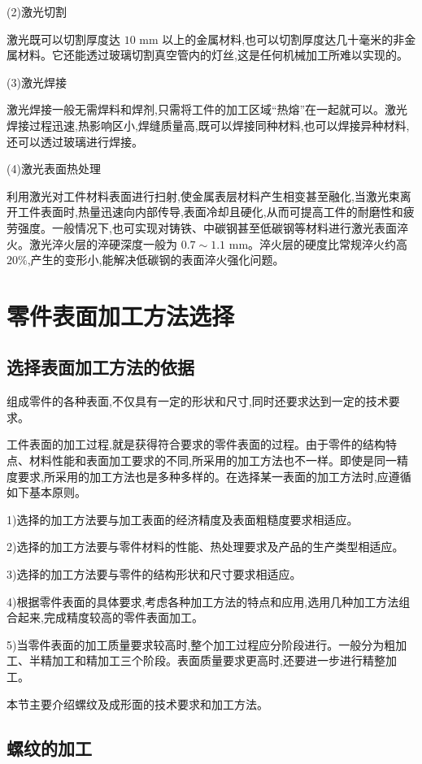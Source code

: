 \documentclass[UTF8]{ctexbook}
\newcommand{\◎}{\ensuremath{\bigcirc}}
\begin{document}
(2)激光切割

激光既可以切割厚度达 $10\text{ mm}$ 以上的金属材料,也可以切割厚度达几十毫米的非金属材料。它还能透过玻璃切割真空管内的灯丝,这是任何机械加工所难以实现的。

(3)激光焊接

激光焊接一般无需焊料和焊剂,只需将工件的加工区域“热熔”在一起就可以。激光焊接过程迅速,热影响区小,焊缝质量高,既可以焊接同种材料,也可以焊接异种材料,还可以透过玻璃进行焊接。

(4)激光表面热处理

利用激光对工件材料表面进行扫射,使金属表层材料产生相变甚至融化,当激光束离开工件表面时,热量迅速向内部传导,表面冷却且硬化,从而可提高工件的耐磨性和疲劳强度。一般情况下,也可实现对铸铁、中碳钢甚至低碳钢等材料进行激光表面淬火。激光淬火层的淬硬深度一般为 $0.7 \sim 1.1\text{ mm}$。淬火层的硬度比常规淬火约高 $20\%$,产生的变形小,能解决低碳钢的表面淬火强化问题。

\section{零件表面加工方法选择}

\subsection{选择表面加工方法的依据}

组成零件的各种表面,不仅具有一定的形状和尺寸,同时还要求达到一定的技术要求。

工件表面的加工过程,就是获得符合要求的零件表面的过程。由于零件的结构特点、材料性能和表面加工要求的不同,所采用的加工方法也不一样。即使是同一精度要求,所采用的加工方法也是多种多样的。在选择某一表面的加工方法时,应遵循如下基本原则。


1)选择的加工方法要与加工表面的经济精度及表面粗糙度要求相适应。

2)选择的加工方法要与零件材料的性能、热处理要求及产品的生产类型相适应。

3)选择的加工方法要与零件的结构形状和尺寸要求相适应。

4)根据零件表面的具体要求,考虑各种加工方法的特点和应用,选用几种加工方法组合起来,完成精度较高的零件表面加工。

5)当零件表面的加工质量要求较高时,整个加工过程应分阶段进行。一般分为粗加工、半精加工和精加工三个阶段。表面质量要求更高时,还要进一步进行精整加工。


本节主要介绍螺纹及成形面的技术要求和加工方法。

\subsection{螺纹的加工}
\end{document}
